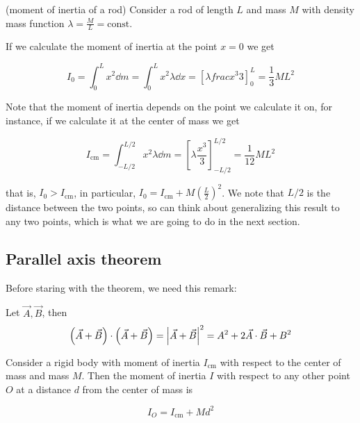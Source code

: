 \documentclass[12pt]{extarticle}
\begin{document}
\begin{example}(moment of inertia of a rod)
    Consider a rod of length $L$ and mass $M$ with density mass function $\lambda = \frac{M}{L} = \text{const}$.

    If we calculate the moment of inertia at the point $x = 0$ we get

    \begin{equation}
        I_0 = \int_0^L x^2 \dd{m} = \int_0^L x^2 \lambda \dd{x} = \left[ \lambda frac{x^3}{3} \right]_0^L = \frac{1}{3} ML^2
    \end{equation}

    Note that the moment of inertia depends on the point we calculate it on, for instance, if we calculate it at the center of mass we get

    \begin{equation}
        I_{\text{cm}} = \int_{-L/2}^{L/2} x^2 \lambda \dd{m} = \left[ \lambda \frac{x^3}{3} \right]_{-L/2}^{L/2} = \frac{1}{12} ML^2
    \end{equation}


    that is, $I_0 > I_{\text{cm}}$, in particular, $I_0 = I_{\text{cm}} + M \left(\frac{L}{2}\right)^2$.
    We note that $L/2$ is the distance between the two points, so can think about generalizing this result to any two points, which is what we are going to do in the next section.
\end{example}

\subsection{Parallel axis theorem}

Before staring with the theorem, we need this remark:
\begin{remark}
    Let $\vec{A}, \vec{B}$, then
    \begin{equation}
        \left( \vec{A} + \vec{B} \right) \cdot \left( \vec{A} + \vec{B} \right) = \abs{\vec{A} + \vec{B}}^2 = A^2 + 2 \vec{A} \cdot \vec{B} + B^2
    \end{equation}
\end{remark}

\begin{theorem}
    Consider a rigid body with moment of inertia $I_{\text{cm}}$ with respect to the center of mass and mass $M$. Then the moment of inertia $I$ with respect to any other point $O$ at a distance $d$ from the center of mass is

    \begin{equation}
        I_O = I_{\text{cm}} + M d^2
    \end{equation}

    \label{thm:parallel_axis}
\end{theorem}
\end{document}
